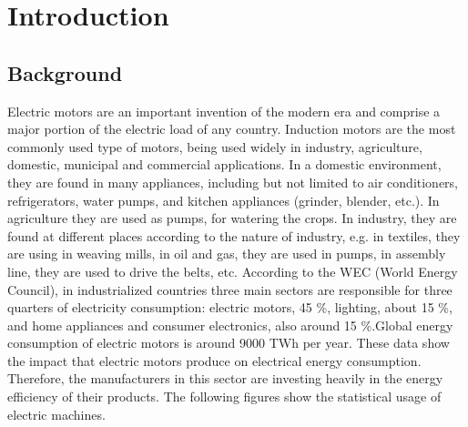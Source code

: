 \chapter{Introduction} %
\label{Chapter1}

\section{Background}

Electric motors are an important invention of the modern era and comprise a major portion of the electric load of any country. Induction motors are the most commonly used type of motors, being used widely in industry, agriculture, domestic, municipal and commercial applications. In a domestic environment, they are found in many appliances, including but not limited to air conditioners, refrigerators, water pumps, and kitchen appliances (grinder, blender, etc.). In agriculture they are used as pumps, for watering the crops. In industry, they are found at different places according to the nature of industry, e.g. in textiles, they are using in weaving mills, in oil and gas, they are used in pumps, in assembly line, they are used to drive the belts, etc. According to the WEC (World Energy Council), in industrialized countries three main sectors are responsible for three quarters of electricity consumption: electric motors, 45 \%, lighting, about 15 \%, and home appliances and consumer electronics, also around 15 \%.Global energy consumption of electric motors is around 9000 TWh per year\cite{tandel2019energy}. These data show the impact that electric motors produce on electrical energy consumption. Therefore, the manufacturers in this sector are investing heavily in the energy efficiency of their products. The following figures show the statistical usage of electric machines.

